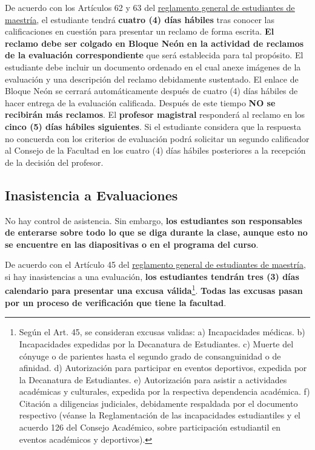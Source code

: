 \documentclass[12pt]{article}
\begin{document}
De acuerdo con los Artículos 62 y 63 del \href{https://secretariageneral.uniandes.edu.co/images/documents/reglamento-maestria-web-2023.pdf}{\underline{reglamento general de estudiantes de maestría}}, el estudiante tendrá \textbf{cuatro (4) días hábiles} tras conocer las calificaciones en cuestión para presentar un reclamo de forma escrita. \textbf{El reclamo debe ser colgado en Bloque Neón en la actividad de reclamos de la evaluación correspondiente} que será establecida para tal propósito. El estudiante debe incluir un documento ordenado en el cual anexe imágenes de la evaluación y una descripción del reclamo debidamente sustentado. El enlace de Bloque Neón se cerrará automáticamente después de cuatro (4) días hábiles de hacer entrega de la evaluación calificada. Después de este tiempo \textbf{NO se recibirán más reclamos}. El \textbf{profesor magistral} responderá al reclamo en los \textbf{cinco (5) días hábiles siguientes}. Si el estudiante considera que la respuesta no concuerda con los criterios de evaluación podrá solicitar un segundo calificador al Consejo de la Facultad en los cuatro (4) días hábiles posteriores a la recepción de la decisión del profesor. 

\subsection*{Inasistencia a Evaluaciones} 

No hay control de asistencia. Sin embargo, \textbf{los estudiantes son responsables de enterarse sobre todo lo que se diga durante la clase, aunque esto no se encuentre en las diapositivas o en el programa del curso}.

De acuerdo con el Artículo 45 del \href{https://secretariageneral.uniandes.edu.co/images/documents/reglamento-maestria-web-2023.pdf}{\underline{reglamento general de estudiantes de maestría}}, si hay inasistencias a una evaluación, \textbf{los estudiantes tendrán tres (3) días calendario para presentar una excusa válida}\footnote{Según el Art. 45, se consideran excusas validas: a) Incapacidades médicas. b) Incapacidades expedidas por la Decanatura de Estudiantes. c) Muerte del cónyuge o de parientes hasta el segundo grado de consanguinidad o de afinidad. d) Autorización para participar en eventos deportivos, expedida por la Decanatura de Estudiantes. e) Autorización para asistir a actividades académicas y culturales, expedida por la respectiva dependencia académica. f) Citación a diligencias judiciales, debidamente respaldada por el documento respectivo (véanse la Reglamentación de las incapacidades estudiantiles y el acuerdo 126 del Consejo Académico, sobre participación estudiantil en eventos académicos y deportivos).}. \textbf{Todas las excusas pasan por un proceso de verificación que tiene la facultad}.
\end{document}
